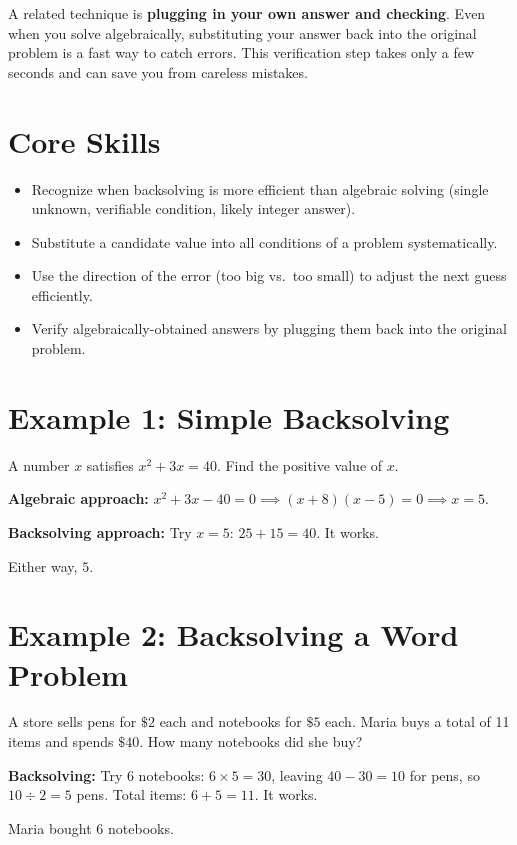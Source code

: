 \documentclass[14pt]{extarticle}
\begin{document}
A related technique is \textbf{plugging in your own answer and checking}. Even when you solve algebraically, substituting your answer back into the original problem is a fast way to catch errors. This verification step takes only a few seconds and can save you from careless mistakes.

\section*{Core Skills}
\begin{itemize}
  \item Recognize when backsolving is more efficient than algebraic solving (single unknown, verifiable condition, likely integer answer).
  \item Substitute a candidate value into all conditions of a problem systematically.
  \item Use the direction of the error (too big vs.\ too small) to adjust the next guess efficiently.
  \item Verify algebraically-obtained answers by plugging them back into the original problem.
\end{itemize}

\section*{Example 1: Simple Backsolving}

A number \(x\) satisfies \(x^2 + 3x = 40\). Find the positive value of \(x\).

\textbf{Algebraic approach:} \(x^2 + 3x - 40 = 0 \implies (x+8)(x-5) = 0 \implies x = 5\).

\textbf{Backsolving approach:} Try \(x = 5\): \(25 + 15 = 40\). It works.

Either way, \(\boxed{5}\).

\section*{Example 2: Backsolving a Word Problem}

A store sells pens for \(\$2\) each and notebooks for \(\$5\) each. Maria buys a total of 11 items and spends \(\$40\). How many notebooks did she buy?

\textbf{Backsolving:} Try 6 notebooks: \(6 \times 5 = 30\), leaving \(40 - 30 = 10\) for pens, so \(10 \div 2 = 5\) pens. Total items: \(6 + 5 = 11\). It works.

Maria bought \(\boxed{6}\) notebooks.
\end{document}
